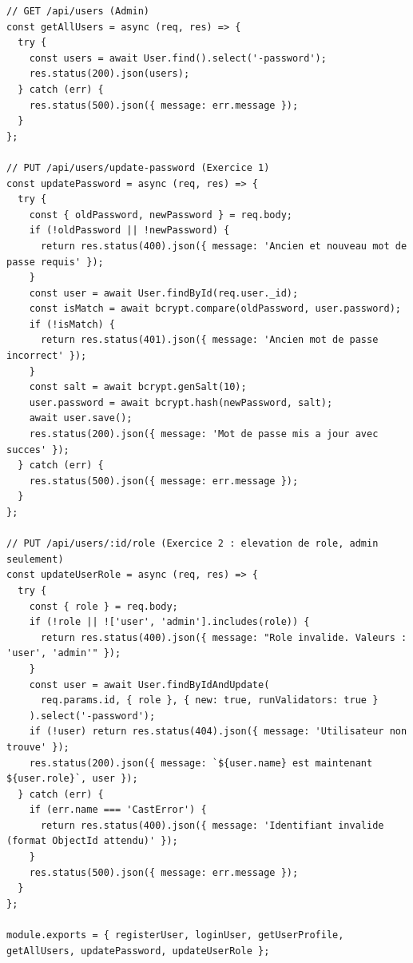 \documentclass[12pt, a4paper]{article}
\begin{document}
\begin{lstlisting}
// GET /api/users (Admin)
const getAllUsers = async (req, res) => {
  try {
    const users = await User.find().select('-password');
    res.status(200).json(users);
  } catch (err) {
    res.status(500).json({ message: err.message });
  }
};

// PUT /api/users/update-password (Exercice 1)
const updatePassword = async (req, res) => {
  try {
    const { oldPassword, newPassword } = req.body;
    if (!oldPassword || !newPassword) {
      return res.status(400).json({ message: 'Ancien et nouveau mot de passe requis' });
    }
    const user = await User.findById(req.user._id);
    const isMatch = await bcrypt.compare(oldPassword, user.password);
    if (!isMatch) {
      return res.status(401).json({ message: 'Ancien mot de passe incorrect' });
    }
    const salt = await bcrypt.genSalt(10);
    user.password = await bcrypt.hash(newPassword, salt);
    await user.save();
    res.status(200).json({ message: 'Mot de passe mis a jour avec succes' });
  } catch (err) {
    res.status(500).json({ message: err.message });
  }
};

// PUT /api/users/:id/role (Exercice 2 : elevation de role, admin seulement)
const updateUserRole = async (req, res) => {
  try {
    const { role } = req.body;
    if (!role || !['user', 'admin'].includes(role)) {
      return res.status(400).json({ message: "Role invalide. Valeurs : 'user', 'admin'" });
    }
    const user = await User.findByIdAndUpdate(
      req.params.id, { role }, { new: true, runValidators: true }
    ).select('-password');
    if (!user) return res.status(404).json({ message: 'Utilisateur non trouve' });
    res.status(200).json({ message: `${user.name} est maintenant ${user.role}`, user });
  } catch (err) {
    if (err.name === 'CastError') {
      return res.status(400).json({ message: 'Identifiant invalide (format ObjectId attendu)' });
    }
    res.status(500).json({ message: err.message });
  }
};

module.exports = { registerUser, loginUser, getUserProfile, getAllUsers, updatePassword, updateUserRole };
\end{lstlisting}
\end{document}
